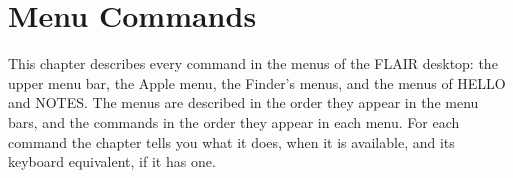 \chapter{Menu Commands}
\label{ch:menus}

This chapter describes every command in the menus of the FLAIR desktop:
the upper menu bar, the Apple menu, the Finder's menus, and the menus of
HELLO and NOTES.  The menus are described in the order they appear in the
menu bars, and the commands in the order they appear in each menu.  For
each command the chapter tells you what it does, when it is available, and
its keyboard equivalent, if it has one.


